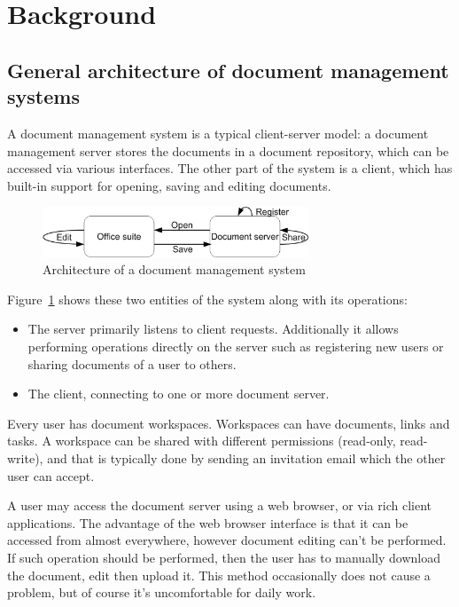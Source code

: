 \section{Background}

\subsection{General architecture of document management systems}

A document management system is a typical client-server model: a document
management server stores the documents in a document repository, which can be
accessed via various interfaces.  The other part of the system is a client,
which has built-in support for opening, saving and editing documents.

\begin{figure}[H]
\centering
\includegraphics[width=300px,keepaspectratio]{general-arch-of-doc-mgmt-systems.pdf}
\caption{Architecture of a document management system}
\label{fig:general-arch-of-doc-mgmt-systems}
\end{figure}

Figure~\ref{fig:general-arch-of-doc-mgmt-systems} shows these two entities of
the system along with its operations:

\begin{itemize}
\item The server primarily listens to client requests. Additionally it allows
performing operations directly on the server such as registering new users or
sharing documents of a user to others.
\item The client, connecting to one or more document server.
\end{itemize}

Every user has document workspaces. Workspaces can have documents, links and
tasks. A workspace can be shared with different permissions (read-only,
read-write), and that is typically done by sending an invitation email which
the other user can accept.

A user may access the document server using a web browser, or via rich client
applications. The advantage of the web browser interface is that it can be
accessed from almost everywhere, however document editing can't be performed.
If such operation should be performed, then the user has to manually download
the document, edit then upload it. This method occasionally does not cause a
problem, but of course it's uncomfortable for daily work.

